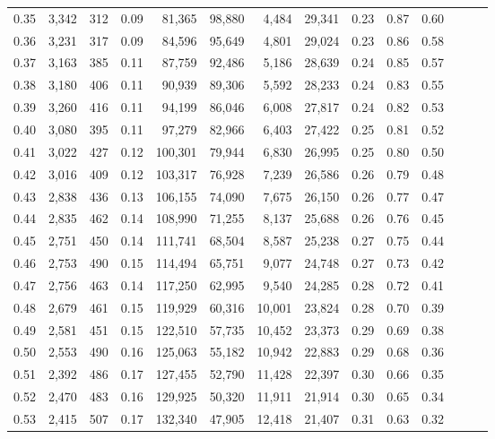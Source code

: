 \begin{tabular}{rrrrrrrrrrrrrr}
0.35 &  3,342 &  312 &  0.09 &   81,365 &   98,880 &   4,484 &  29,341 &  0.23 &  0.87 &      0.60 \\
0.36 &  3,231 &  317 &  0.09 &   84,596 &   95,649 &   4,801 &  29,024 &  0.23 &  0.86 &      0.58 \\
0.37 &  3,163 &  385 &  0.11 &   87,759 &   92,486 &   5,186 &  28,639 &  0.24 &  0.85 &      0.57 \\
0.38 &  3,180 &  406 &  0.11 &   90,939 &   89,306 &   5,592 &  28,233 &  0.24 &  0.83 &      0.55 \\
0.39 &  3,260 &  416 &  0.11 &   94,199 &   86,046 &   6,008 &  27,817 &  0.24 &  0.82 &      0.53 \\
0.40 &  3,080 &  395 &  0.11 &   97,279 &   82,966 &   6,403 &  27,422 &  0.25 &  0.81 &      0.52 \\
0.41 &  3,022 &  427 &  0.12 &  100,301 &   79,944 &   6,830 &  26,995 &  0.25 &  0.80 &      0.50 \\
0.42 &  3,016 &  409 &  0.12 &  103,317 &   76,928 &   7,239 &  26,586 &  0.26 &  0.79 &      0.48 \\
0.43 &  2,838 &  436 &  0.13 &  106,155 &   74,090 &   7,675 &  26,150 &  0.26 &  0.77 &      0.47 \\
0.44 &  2,835 &  462 &  0.14 &  108,990 &   71,255 &   8,137 &  25,688 &  0.26 &  0.76 &      0.45 \\
0.45 &  2,751 &  450 &  0.14 &  111,741 &   68,504 &   8,587 &  25,238 &  0.27 &  0.75 &      0.44 \\
0.46 &  2,753 &  490 &  0.15 &  114,494 &   65,751 &   9,077 &  24,748 &  0.27 &  0.73 &      0.42 \\
0.47 &  2,756 &  463 &  0.14 &  117,250 &   62,995 &   9,540 &  24,285 &  0.28 &  0.72 &      0.41 \\
0.48 &  2,679 &  461 &  0.15 &  119,929 &   60,316 &  10,001 &  23,824 &  0.28 &  0.70 &      0.39 \\
0.49 &  2,581 &  451 &  0.15 &  122,510 &   57,735 &  10,452 &  23,373 &  0.29 &  0.69 &      0.38 \\
0.50 &  2,553 &  490 &  0.16 &  125,063 &   55,182 &  10,942 &  22,883 &  0.29 &  0.68 &      0.36 \\
0.51 &  2,392 &  486 &  0.17 &  127,455 &   52,790 &  11,428 &  22,397 &  0.30 &  0.66 &      0.35 \\
0.52 &  2,470 &  483 &  0.16 &  129,925 &   50,320 &  11,911 &  21,914 &  0.30 &  0.65 &      0.34 \\
0.53 &  2,415 &  507 &  0.17 &  132,340 &   47,905 &  12,418 &  21,407 &  0.31 &  0.63 &      0.32 \\

\end{tabular}
